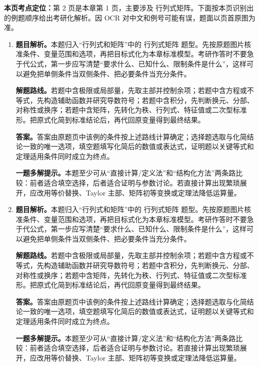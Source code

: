 \begin{solutionblock}
\textbf{本页考点定位：}第 2 页是本章第 1 页，主要涉及 行列式矩阵。下面按本页识别出的例题顺序给出考研化解析。因 OCR 对中文和例号可能有误，题面以页首原图为准。

\begin{enumerate}[label=\textbf{例\arabic*.}, leftmargin=2.4em]

\item \textbf{题目解析。}本题归入“行列式和矩阵”中的 行列式矩阵 题型。先按原题图片核准条件、变量范围和选项，再把目标式化为本章标准模型。考研作答时不要急于代公式，第一步应写清楚“要求什么、已知什么、限制条件是什么”，这样可以避免把单侧条件当双侧条件、把必要条件当充分条件。

\textbf{解题路线。}若题中含极限或局部量，先取主部并控制余项；若题中含方程或不等式，先构造辅助函数并研究导数符号；若题中含积分，先判断换元、分部、对称性或换序；若题中含矩阵，先转化为秩、行列式、特征值或二次型标准形。把原式化简到标准结论后，再代回原变量得到最终结果。

\textbf{答案。}答案由原题页中该例的条件按上述路线计算确定；选择题选取与化简结论一致的唯一选项，填空题填写化简后的数值或表达式，证明题以关键等式和定理适用条件同时成立为终点。

\textbf{一题多解提示。}本题至少可从“直接计算/定义法”和“结构化方法”两条路比较：前者适合填空选择，后者适合证明与参数讨论。若直接计算出现繁琐展开，应改用等价替换、Taylor 主部、矩阵初等变换或定理法降低运算量。

\item \textbf{题目解析。}本题归入“行列式和矩阵”中的 行列式矩阵 题型。先按原题图片核准条件、变量范围和选项，再把目标式化为本章标准模型。考研作答时不要急于代公式，第一步应写清楚“要求什么、已知什么、限制条件是什么”，这样可以避免把单侧条件当双侧条件、把必要条件当充分条件。

\textbf{解题路线。}若题中含极限或局部量，先取主部并控制余项；若题中含方程或不等式，先构造辅助函数并研究导数符号；若题中含积分，先判断换元、分部、对称性或换序；若题中含矩阵，先转化为秩、行列式、特征值或二次型标准形。把原式化简到标准结论后，再代回原变量得到最终结果。

\textbf{答案。}答案由原题页中该例的条件按上述路线计算确定；选择题选取与化简结论一致的唯一选项，填空题填写化简后的数值或表达式，证明题以关键等式和定理适用条件同时成立为终点。

\textbf{一题多解提示。}本题至少可从“直接计算/定义法”和“结构化方法”两条路比较：前者适合填空选择，后者适合证明与参数讨论。若直接计算出现繁琐展开，应改用等价替换、Taylor 主部、矩阵初等变换或定理法降低运算量。


\end{enumerate}
\end{solutionblock}
